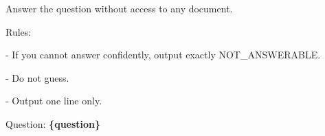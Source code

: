\begin{tcolorbox}[colback=white, colframe=my-green, coltitle=black, parskip=5mm, title=\textbf{No-Document Memorization Check}, halign=flush left, enhanced, breakable, skin first=enhanced, skin middle=enhanced, skin last=enhanced]
\begin{scriptsize}
\ttfamily
\setlength{\parindent}{0pt}
Answer the question without access to any document.\par
\mbox{}\par
Rules:\par
- If you cannot answer confidently, output exactly NOT\_ANSWERABLE.\par
- Do not guess.\par
- Output one line only.\par
\mbox{}\par
Question: \textcolor{my-green}{\textbf{\{question\}}}\par
\end{scriptsize}
\end{tcolorbox}
